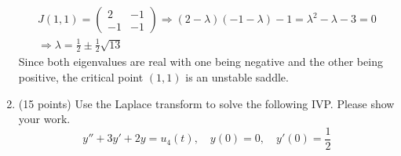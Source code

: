 \documentclass[11pt, titlepage]{article}
\begin{document}
\begin{enumerate}
\begin{solution}
\begin{gather*}
                    J(1, 1) =
                    \begin{pmatrix}
                        2 & -1 \\
                        -1 & -1
                    \end{pmatrix} \Longrightarrow
                    (2-\lambda)(-1-\lambda) - 1 = \lambda^2 - \lambda - 3 = 0 \\
                    \Longrightarrow \lambda = \frac{1}{2} \pm \frac{1}{2}
                    \sqrt{13}
                \end{gather*}
                Since both eigenvalues are real with one being negative and the
                other being positive, the critical point $(1, 1)$ is an unstable
                saddle.
            \end{solution}

        \pagebreak

        \item (15 points) Use the Laplace transform to solve the following IVP.
            Please show your work.
            \[
                y'' + 3y' + 2y = u_4(t), \quad y(0) = 0, \quad y'(0)=\frac{1}{2}
            \] 


\end{enumerate}
\end{document}
